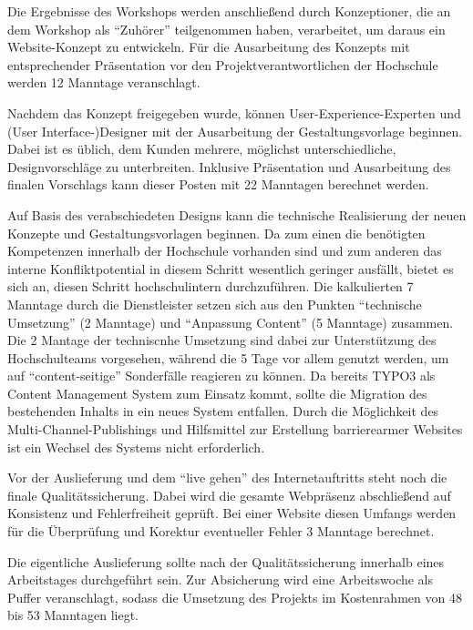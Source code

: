 \documentclass[a4paper]{article}
\begin{document}
\bigskip

{\sffamily
Die Ergebnisse des Workshops werden anschließend durch Konzeptioner, die an dem Workshop als “Zuhörer” teilgenommen
haben, verarbeitet, um daraus ein Website-Konzept zu entwickeln. Für die Ausarbeitung des Konzepts mit entsprechender
Präsentation vor den Projektverantwortlichen der Hochschule werden 12 Manntage veranschlagt.}


\bigskip

{\sffamily
Nachdem das Konzept freigegeben wurde, können User-Experience-Experten und (User Interface-)Designer mit der
Ausarbeitung der Gestaltungsvorlage beginnen. Dabei ist es üblich, dem Kunden mehrere, möglichst unterschiedliche,
Designvorschläge zu unterbreiten. Inklusive Präsentation und Ausarbeitung des finalen Vorschlags kann dieser Posten mit
22 Manntagen berechnet werden.}


\bigskip

{\sffamily
Auf Basis des verabschiedeten Designs kann die technische Realisierung der neuen Konzepte und Gestaltungsvorlagen
beginnen. Da zum einen die benötigten Kompetenzen innerhalb der Hochschule vorhanden sind und zum anderen das interne
Konfliktpotential in diesem Schritt wesentlich geringer ausfällt, bietet es sich an, diesen Schritt hochschulintern
durchzuführen. Die kalkulierten 7 Manntage durch die Dienstleister setzen sich aus den Punkten “technische Umsetzung”
(2 Manntage) und “Anpassung Content” (5 Manntage) zusammen. Die 2 Mantage der techniscnhe Umsetzung sind dabei zur
Unterstützung des Hochschulteams vorgesehen, während die 5 Tage vor allem genutzt werden, um auf “content-seitige”
Sonderfälle reagieren zu können. Da bereits TYPO3 als Content Management System zum Einsatz kommt, sollte die Migration
des bestehenden Inhalts in ein neues System entfallen. Durch die Möglichkeit des Multi-Channel-Publishings und
Hilfsmittel zur Erstellung barrierearmer Websites ist ein Wechsel des Systems nicht erforderlich.}


\bigskip

{\sffamily
Vor der Auslieferung und dem “live gehen” des Internetauftritts steht noch die finale Qualitätssicherung. Dabei wird die
gesamte Webpräsenz abschließend auf Konsistenz und Fehlerfreiheit geprüft. Bei einer Website diesen Umfangs werden für
die Überprüfung und Korektur eventueller Fehler 3 Manntage berechnet.}


\bigskip

{\sffamily
Die eigentliche Auslieferung sollte nach der Qualitätssicherung innerhalb eines Arbeitstages durchgeführt sein. Zur
Absicherung wird eine Arbeitswoche als Puffer veranschlagt, sodass die Umsetzung des Projekts im Kostenrahmen von 48
bis 53 Manntagen liegt.}
\end{document}
